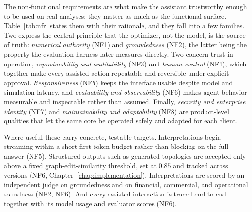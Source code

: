 The non-functional requirements are what make the assistant trustworthy enough to
be used on real analyses; they matter as much as the functional surface.
Table~\ref{tab:nfr} states them with their rationale, and they fall into a few
families. Two express the central principle that the optimizer, not the model, is
the source of truth: \emph{numerical authority} (NF1) and \emph{groundedness}
(NF2), the latter being the property the evaluation harness later measures
directly. Two concern trust in operation, \emph{reproducibility and auditability}
(NF3) and \emph{human control} (NF4), which together make every assisted action
repeatable and reversible under explicit approval. \emph{Responsiveness} (NF5)
keeps the interface usable despite model and simulation latency, and
\emph{evaluability and observability} (NF6) makes agent behavior measurable and
inspectable rather than assumed. Finally, \emph{security and enterprise identity}
(NF7) and \emph{maintainability and adaptability} (NF8) are product-level qualities
that let the same core be operated safely and adapted for each client.

Where useful these carry concrete, testable targets. Interpretations begin
streaming within a short first-token budget rather than blocking on the full
answer (NF5). Structured outputs such as generated topologies are accepted only
above a fixed graph-edit-similarity threshold, set at $0.85$ and tracked across
versions (NF6, Chapter~\ref{chap:implementation}). Interpretations are scored by an
independent judge on groundedness and on financial, commercial, and operational
soundness (NF2, NF6). And every assisted interaction is traced end to end together
with its model usage and evaluator scores (NF6).

